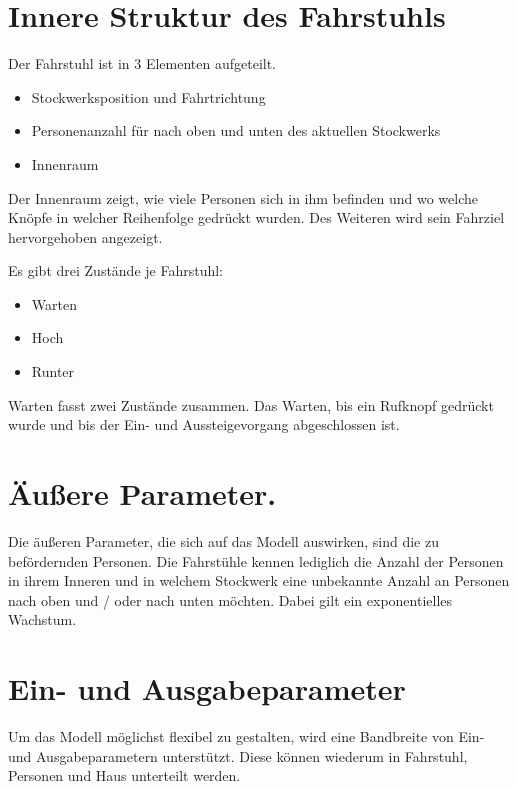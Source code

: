 \documentclass[envcountsame, envcountchap, deutsch]{i-studis}
\providecommand{\tightlist}{%
  \setlength{\itemsep}{0pt}\setlength{\parskip}{0pt}}
\begin{document}
\hypertarget{innere-struktur-des-fahrstuhls}{%
\section{Innere Struktur des
Fahrstuhls}\label{innere-struktur-des-fahrstuhls}}

Der Fahrstuhl ist in 3 Elementen aufgeteilt.

\begin{itemize}
\tightlist
\item
  Stockwerksposition und Fahrtrichtung
\item
  Personenanzahl für nach oben und unten des aktuellen Stockwerks
\item
  Innenraum
\end{itemize}

Der Innenraum zeigt, wie viele Personen sich in ihm befinden und wo
welche Knöpfe in welcher Reihenfolge gedrückt wurden. Des Weiteren wird
sein Fahrziel hervorgehoben angezeigt.

Es gibt drei Zustände je Fahrstuhl:

\begin{itemize}
\tightlist
\item
  Warten
\item
  Hoch
\item
  Runter
\end{itemize}

Warten fasst zwei Zustände zusammen. Das Warten, bis ein Rufknopf
gedrückt wurde und bis der Ein- und Aussteigevorgang abgeschlossen ist.

\hypertarget{uxe4uuxdfere-parameter.}{%
\section{Äußere Parameter.}\label{uxe4uuxdfere-parameter.}}

Die äußeren Parameter, die sich auf das Modell auswirken, sind die zu
befördernden Personen. Die Fahrstühle kennen lediglich die Anzahl der
Personen in ihrem Inneren und in welchem Stockwerk eine unbekannte
Anzahl an Personen nach oben und / oder nach unten möchten. Dabei gilt
ein exponentielles Wachstum.

\hypertarget{ein--und-ausgabeparameter}{%
\section{Ein- und Ausgabeparameter}\label{ein--und-ausgabeparameter}}

Um das Modell möglichst flexibel zu gestalten, wird eine Bandbreite von
Ein- und Ausgabeparametern unterstützt. Diese können wiederum in
Fahrstuhl, Personen und Haus unterteilt werden.
\end{document}
